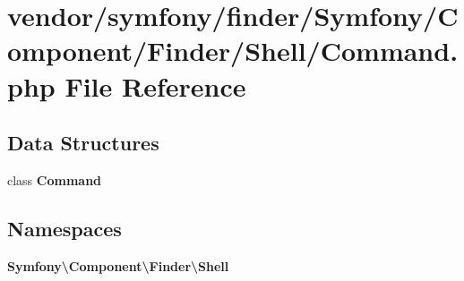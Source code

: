 \section{vendor/symfony/finder/\+Symfony/\+Component/\+Finder/\+Shell/\+Command.php File Reference}
\label{vendor_2symfony_2finder_2_symfony_2_component_2_finder_2_shell_2_command_8php}
\subsection*{Data Structures}
\begin{DoxyCompactItemize}
\item 
class {\bf Command}
\end{DoxyCompactItemize}
\subsection*{Namespaces}
\begin{DoxyCompactItemize}
\item 
 {\bf Symfony\textbackslash{}\+Component\textbackslash{}\+Finder\textbackslash{}\+Shell}
\end{DoxyCompactItemize}
